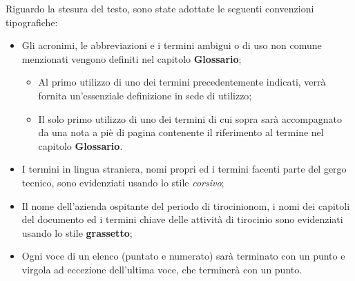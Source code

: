 Riguardo la stesura del testo, sono state adottate le seguenti convenzioni tipografiche:
\begin{itemize}
	\item Gli acronimi, le abbreviazioni e i termini ambigui o di uso non comune menzionati vengono definiti nel capitolo \textbf{Glossario}; 
        \begin{itemize}
            \item Al primo utilizzo di uno dei termini precedentemente indicati, verrà fornita un'essenziale definizione in sede di utilizzo;
            \item Il solo primo utilizzo di uno dei termini di cui sopra sarà accompagnato da una nota a piè di pagina contenente il riferimento al termine nel capitolo \textbf{Glossario}.
        \end{itemize} 
	\item I termini in lingua straniera, nomi propri ed i termini facenti parte del gergo tecnico, sono evidenziati usando lo stile \textit{corsivo};
	\item Il nome dell'azienda ospitante del periodo di tirocinionom, i nomi dei capitoli del documento ed i termini chiave delle attività di tirocinio sono evidenziati usando lo stile \textbf{grassetto};
	\item Ogni voce di un elenco (puntato e numerato) sarà terminato con un punto e virgola ad eccezione dell'ultima voce, che terminerà con un punto.
\end{itemize}



\endgroup

\vfill
